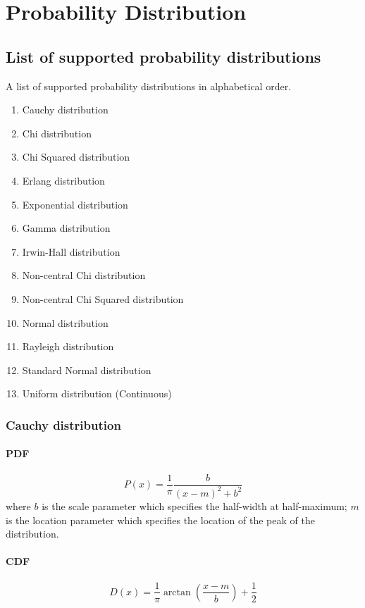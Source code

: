 \chapter{Probability Distribution}
\label{ch:prob_distr}

\section{List of supported probability distributions}
A list of supported probability distributions in alphabetical order.

\begin{enumerate}
    \item Cauchy distribution
    \item Chi distribution
    \item Chi Squared distribution
    \item Erlang distribution
    \item Exponential distribution
    \item Gamma distribution
    \item Irwin-Hall distribution
    \item Non-central Chi distribution
    \item Non-central Chi Squared distribution
    \item Normal distribution
    \item Rayleigh distribution
    \item Standard Normal distribution
    \item Uniform distribution (Continuous)
\end{enumerate}


\subsection{Cauchy distribution}

\subsubsection*{PDF}
\[
    P(x) = \frac{1}{\pi} \frac{b}{(x-m)^2 + b^2}
\]
where $b$ is the scale parameter which specifies the half-width at half-maximum; 
$m$ is the location parameter which specifies the location of the peak of the distribution.

\subsubsection*{CDF}
\[
    D(x) = \frac{1}{\pi} \arctan{(\frac{x-m}{b})} + \frac{1}{2}
\]

